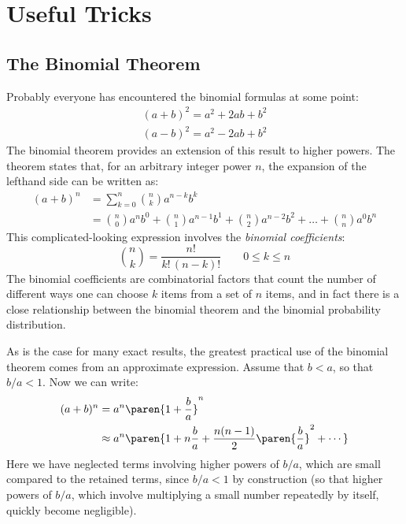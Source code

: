 \section{Useful Tricks}

\subsection{The Binomial Theorem}


Probably everyone has encountered the binomial formulas at some point:
%
\begin{gather*}
( a + b )^2 = a^2 + 2ab + b^2 \\
( a - b )^2 = a^2 - 2ab + b^2 
\end{gather*}
%
The binomial theorem provides an extension of this result to higher
powers. The theorem states that, for an arbitrary integer power $n$,
the expansion of the lefthand side can be written as:
%
\begin{align*}
( a + b )^n & = \sum_{k=0}^n \binom{n}{k} a^{n-k} b^k \\
            & = \binom{n}{0} a^n b^0 + \binom{n}{1} a^{n-1} b^1 
              + \binom{n}{2} a^{n-2} b^2 + \dots + \binom{n}{n} a^0 b^n
\end{align*}
%
This complicated-looking expression involves the
\emph{binomial coefficients}:
%
\[
\binom{n}{k} = \frac{n!}{k! \, (n-k)!} \qquad 0 \le k \le n
\]
%
The binomial coefficients are combinatorial factors that count the
number of different ways one can choose $k$ items from a set of $n$
items, and in fact there is a close relationship between the binomial
theorem and the binomial probability distribution.

As is the case for many exact results, the greatest practical use of
the binomial theorem comes from an approximate expression. Assume that
$b < a$, so that $b/a < 1$. Now we can write:
%
\begin{align*}
( a + b )^n & = a^n \paren{ 1 + \frac{b}{a} }^n \\
      & \approx a^n \paren{ 1 + n \frac{b}{a} 
                              + \frac{n(n-1)}{2} \paren{ \frac{b}{a} }^2
                              + \dotsb }
\end{align*}
%
Here we have neglected terms involving higher powers of $b/a$, which
are small compared to the retained terms, since $b/a < 1$ by
construction (so that higher powers of $b/a$, which involve
multiplying a small number repeatedly by itself, quickly become
negligible).

